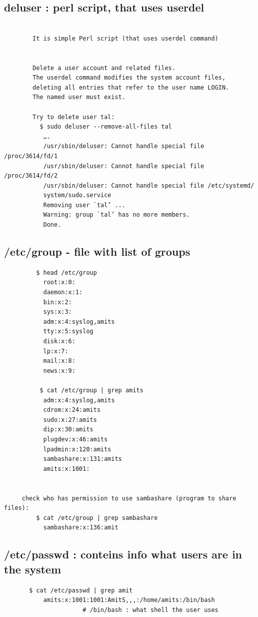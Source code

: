 \documentclass[a4paper,12pt]{article}
\begin{document}
\subsection{deluser   : perl script, that uses userdel}
\begin{verbatim}

        It is simple Perl script (that uses userdel command)


        Delete a user account and related files.
        The userdel command modifies the system account files, 
        deleting all entries that refer to the user name LOGIN.
        The named user must exist.
        
        Try to delete user tal: 
          $ sudo deluser --remove-all-files tal 
           ﻿….
           /usr/sbin/deluser: Cannot handle special file /proc/3614/fd/1
           /usr/sbin/deluser: Cannot handle special file /proc/3614/fd/2
           /usr/sbin/deluser: Cannot handle special file /etc/systemd/   
           system/sudo.service
           Removing user `tal’ ...
           Warning: group `tal’ has no more members.
           Done.
\end{verbatim}


\subsection{/etc/group - file with list of groups }
\begin{verbatim}
         $ head /etc/group
           root:x:0:
           daemon:x:1:
           bin:x:2:
           sys:x:3:
           adm:x:4:syslog,amits
           tty:x:5:syslog
           disk:x:6:
           lp:x:7:
           mail:x:8:
           news:x:9:

          $ cat /etc/group | grep amits
           adm:x:4:syslog,amits
           cdrom:x:24:amits
           sudo:x:27:amits
           dip:x:30:amits
           plugdev:x:46:amits
           lpadmin:x:120:amits
           sambashare:x:131:amits
           amits:x:1001:


     check who has permission to use sambashare (program to share files):
         $ cat /etc/group | grep sambashare
           sambashare:x:136:amit
\end{verbatim}

\subsection{/etc/passwd   : conteins info what users are in the system}
\begin{verbatim}
       $ cat /etc/passwd | grep amit
           amits:x:1001:1001:AmitS,,,:/home/amits:/bin/bash  
                      # /bin/bash : what shell the user uses
\end{verbatim}
\end{document}
